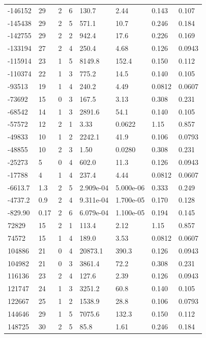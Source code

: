 \documentclass[preview]{standalone}
\begin{document}
{{\begin{tabular}{L{1.2cm}C{1.2cm} C{0.3cm}C{0.5cm} C{1.4cm}C{1.4cm} C{1.4cm}C{1.4cm}}
  -146152  &    29  & 2     &  6 &  130.7  & 2.44  & 0.143 &  0.107   \\ 
  -145438  &    29  & 2     &  5 &  571.1  & 10.7  & 0.246 &  0.184   \\ 
  -142755  &    29  & 2     &  2 &  942.4  & 17.6  & 0.226 &  0.169   \\ 
  -133194  &    27  & 2     &  4 &  250.4  & 4.68  & 0.126 &  0.0943   \\ 
  -115914  &    23  & 1     &  5 &  8149.8  & 152.4  & 0.150 &  0.112   \\ 
  -110374  &    22  & 1     &  3 &  775.2  & 14.5  & 0.140 &  0.105   \\ 
  -93513  &    19  & 1     &  4 &  240.2  & 4.49  & 0.0812 &  0.0607   \\ 
  -73692  &    15  & 0     &  3 &  167.5  & 3.13  & 0.308 &  0.231   \\ 
  -68542  &    14  & 1     &  3 &  2891.6  & 54.1  & 0.140 &  0.105   \\ 
  -57572  &    12  & 2     &  1 &  3.33  & 0.0622  & 1.15 &  0.857   \\ 
  -49833  &    10  & 1     &  2 &  2242.1  & 41.9  & 0.106 &  0.0793   \\ 
  -48855  &    10  & 2     &  3 &  1.50  & 0.0280  & 0.308 &  0.231   \\ 
  -25273  &     5  & 0     &  4 &  602.0  & 11.3  & 0.126 &  0.0943   \\ 
  -17788  &     4  & 1     &  4 &  237.4  & 4.44  & 0.0812 &  0.0607   \\ 
  -6613.7  &   1.3  & 2     &  5 &  2.909e-04  & 5.000e-06  & 0.333 &  0.249   \\ 
  -4737.2  &   0.9  & 2     &  4 &  9.311e-04  & 1.700e-05  & 0.170 &  0.128   \\ 
  -829.90  &  0.17  & 2     &  6 &  6.079e-04  & 1.100e-05  & 0.194 &  0.145   \\ 
  72829  &    15  & 2     &  1 &  113.4  & 2.12  & 1.15 &  0.857   \\ 
  74572  &    15  & 1     &  4 &  189.0  & 3.53  & 0.0812 &  0.0607   \\ 
  104886  &    21  & 0     &  4 &  20873.1  & 390.3  & 0.126 &  0.0943   \\ 
  104982  &    21  & 0     &  3 &  3861.4  & 72.2  & 0.308 &  0.231   \\ 
  116136  &    23  & 2     &  4 &  127.6  & 2.39  & 0.126 &  0.0943   \\ 
  121747  &    24  & 1     &  3 &  3251.2  & 60.8  & 0.140 &  0.105   \\ 
  122667  &    25  & 1     &  2 &  1538.9  & 28.8  & 0.106 &  0.0793   \\ 
  144646  &    29  & 1     &  5 &  7075.6  & 132.3  & 0.150 &  0.112   \\ 
  148725  &    30  & 2     &  5 &  85.8  & 1.61  & 0.246 &  0.184   \\ 
\hline 
\end{tabular} 

}}
\end{document}
